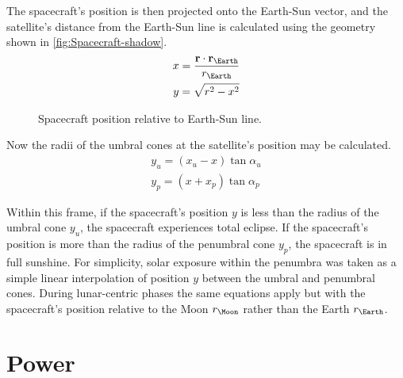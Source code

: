 The spacecraft's position is then projected onto the Earth-Sun vector, and the satellite's distance from the Earth-Sun line is calculated using the geometry shown in \autoref{fig:Spacecraft-shadow}.
\begin{subequations}
\begin{gather}
x = \frac{\vec{r}\cdot\vec{r_\Earth}}{r_\Earth} \\
y = \sqrt{r^2-x^2} 
\end{gather}
\end{subequations}

\begin{figure}
\centering
\def\svgwidth{\figurewidth}

\caption{Spacecraft position relative to Earth-Sun line.} \label{fig:Spacecraft-shadow}
\end{figure}

Now the radii of the umbral cones at the satellite's position may be calculated.
\begin{subequations}
\begin{gather}
y_u = (x_u-x)\tan\alpha_u \\
y_p = (x+x_p)\tan\alpha_p
\end{gather}
\end{subequations}

Within this frame, if the spacecraft's position $y$ is less than the radius of the umbral cone $y_u$, the spacecraft experiences total eclipse. If the spacecraft's position is more than the radius of the penumbral cone $y_p$, the spacecraft is in full sunshine. For simplicity, solar exposure within the penumbra was taken as a simple linear interpolation of position $y$ between the umbral and penumbral cones. During lunar-centric phases the same equations apply but with the spacecraft's position relative to the Moon $r_\Moon$ rather than the Earth $r_\Earth$.


\section{Power}\label{sec:Vehicle-power}

